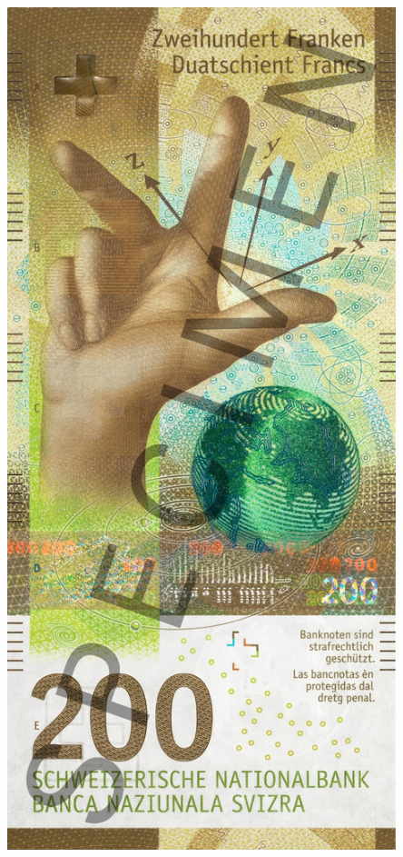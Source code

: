 \documentclass{article}
\begin{document}
\begin{minipage}{0.15\textwidth}
\centering
\includegraphics[width=0.85\textwidth]{Images/billet_200.jpg}
\end{minipage}
\end{document}

